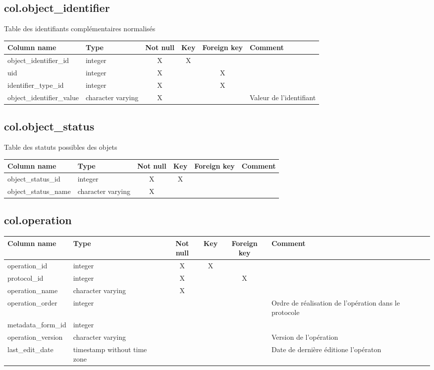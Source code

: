 \subsection{col.object\_identifier}
Table des identifiants complémentaires normalisés

\begin{tabular}{|l| p{2cm}|c|c|c| p{3cm}|}
\hline
Column name & Type & Not null & Key & Foreign key & Comment \\
\hline
object\_identifier\_id & integer & X & X & & \\
\hline
uid & integer & X & & X & \\
\hline
identifier\_type\_id & integer & X & & X & \\
\hline
object\_identifier\_value & character varying & X & & & Valeur de l'identifiant\\
\hline
\end{tabular}
\subsection{col.object\_status}
Table des statuts possibles des objets

\begin{tabular}{|l| p{2cm}|c|c|c| p{3cm}|}
\hline
Column name & Type & Not null & Key & Foreign key & Comment \\
\hline
object\_status\_id & integer & X & X & & \\
\hline
object\_status\_name & character varying & X & & & \\
\hline
\end{tabular}
\subsection{col.operation}


\begin{tabular}{|l| p{2cm}|c|c|c| p{3cm}|}
\hline
Column name & Type & Not null & Key & Foreign key & Comment \\
\hline
operation\_id & integer & X & X & & \\
\hline
protocol\_id & integer & X & & X & \\
\hline
operation\_name & character varying & X & & & \\
\hline
operation\_order & integer & & & & Ordre de réalisation de l'opération dans le protocole\\
\hline
metadata\_form\_id & integer & & & & \\
\hline
operation\_version & character varying & & & & Version de l'opération\\
\hline
last\_edit\_date & timestamp without time zone & & & & Date de dernière éditione l'opératon\\
\hline
\end{tabular}

